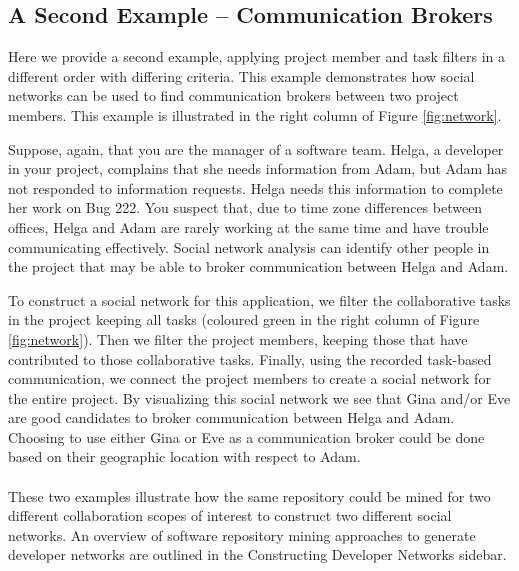 \subsection{A Second Example -- Communication Brokers}
Here we provide a second example, applying project member and task filters in a
different order with differing criteria. This example demonstrates how social
networks can be used to find communication brokers between two project members.
This example is illustrated in the right column of Figure \ref{fig:network}.

Suppose, again, that you are the manager of a software team. Helga, a developer
in your project, complains that she needs information from Adam, but Adam has not
responded to information requests. Helga needs this information to complete her
work on Bug 222. You suspect that, due to time zone differences between
offices, Helga and Adam are rarely working at the same time and have trouble
communicating effectively. Social network analysis can identify other people in
the project that may be able to broker communication between Helga and Adam.

To construct a social network for this application, we filter the collaborative
tasks in the project keeping all tasks (coloured green in the right column of
Figure \ref{fig:network}). Then we filter the project members, keeping those that
have contributed to those collaborative tasks. Finally, using the recorded
task-based communication, we connect the project members to create a social
network for the entire project. By visualizing this social network we see that
Gina and/or Eve are good candidates to broker communication between Helga and
Adam. Choosing to use either Gina or Eve as a communication broker could be done
based on their geographic location with respect to Adam.

\paragraph{}
These two examples illustrate how the same repository could be mined for two
different collaboration scopes of interest to construct two different social
networks. An overview of software repository mining approaches to generate
developer networks are outlined in the Constructing Developer Networks sidebar.




